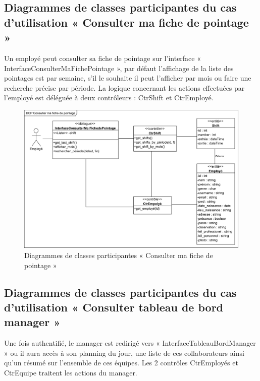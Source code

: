 \subsection*{Diagrammes de classes participantes du cas d'utilisation « Consulter ma fiche de pointage »}
Un employé peut consulter sa fiche de pointage sur l’interface 
« InterfaceConsulterMaFichePointage », par défaut l’affichage de la liste des 
pointages est par semaine, s’il le souhaite il peut l’afficher par mois ou faire
 une recherche précise par période. La logique concernant les actions effectuées
  par l’employé est déléguée à deux contrôleurs : CtrShift et CtrEmployé.
            
\begin{figure}[h!]
    \centering
    \includegraphics[scale=0.72]{images/DCP/DCP Consulter ma fiche de pointage.png}
    \caption{Diagrammes de classes participantes « Consulter ma fiche de pointage »}
    \label{fig26}
\end{figure}
            
\subsection*{Diagrammes de classes participantes du cas d'utilisation « Consulter tableau de bord manager »}
Une fois authentifié, le manager est redirigé vers 
« InterfaceTableauBordManager » ou il aura accès à son planning du jour, une 
liste de ces collaborateurs ainsi qu’un résumé sur l’ensemble de ces équipes. 
Les 2 contrôles CtrEmployés et CtrEquipe traitent les actions du manager. 

